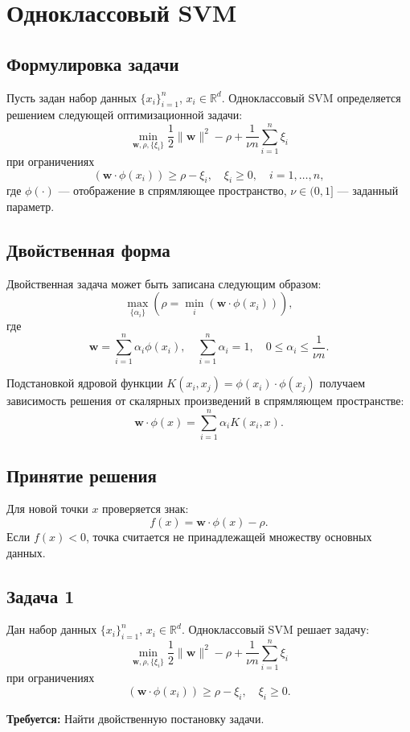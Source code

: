 \section{Одноклассовый SVM}

\subsection{Формулировка задачи}
Пусть задан набор данных $\{x_i\}_{i=1}^n$, $x_i \in \mathbb{R}^d$. Одноклассовый SVM определяется решением следующей оптимизационной задачи:
\[
\min_{\mathbf{w},\rho,\{\xi_i\}} \frac{1}{2}\|\mathbf{w}\|^2 - \rho + \frac{1}{\nu n}\sum_{i=1}^n \xi_i
\]
при ограничениях
\[
(\mathbf{w}\cdot \phi(x_i)) \ge \rho - \xi_i, \quad \xi_i \ge 0, \quad i=1,\dots,n,
\]
где $\phi(\cdot)$ — отображение в спрямляющее пространство, $\nu \in (0,1]$ — заданный параметр.

\subsection{Двойственная форма}
Двойственная задача может быть записана следующим образом:
\[
\max_{\{\alpha_i\}} \left( \rho = \min_i \left( \mathbf{w} \cdot \phi(x_i) \right) \right), 
\]
где
\[
\mathbf{w} = \sum_{i=1}^n \alpha_i \phi(x_i), \quad \sum_{i=1}^n \alpha_i = 1, \quad 0 \le \alpha_i \le \frac{1}{\nu n}.
\]

Подстановкой ядровой функции $K(x_i,x_j) = \phi(x_i) \cdot \phi(x_j)$ получаем зависимость решения от скалярных произведений в спрямляющем пространстве:
\[
\mathbf{w} \cdot \phi(x) = \sum_{i=1}^n \alpha_i K(x_i,x).
\]

\subsection{Принятие решения}
Для новой точки $x$ проверяется знак:
\[
f(x) = \mathbf{w}\cdot\phi(x) - \rho.
\]
Если $f(x)<0$, точка считается не принадлежащей множеству основных данных.

\subsection{Задача 1}
Дан набор данных $\{x_i\}_{i=1}^n$, $x_i \in \mathbb{R}^d$. Одноклассовый SVM решает задачу:
\[
\min_{\mathbf{w},\rho,\{\xi_i\}} \frac{1}{2}\|\mathbf{w}\|^2 - \rho + \frac{1}{\nu n}\sum_{i=1}^n \xi_i
\]
при ограничениях
\[
(\mathbf{w}\cdot\phi(x_i))\ge\rho-\xi_i, \quad \xi_i\ge0.
\]

\textbf{Требуется:} Найти двойственную постановку задачи.

